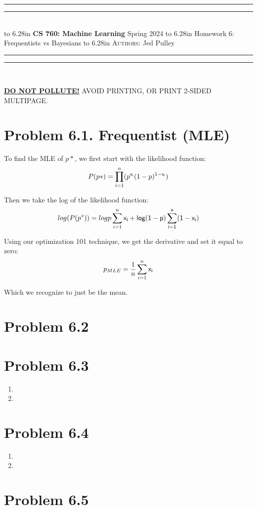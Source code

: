 \documentclass{article}
\newcommand{\lecture}[2]{
\pagestyle{myheadings}
\thispagestyle{plain}
\newpage
\noindent
\begin{center}
\rule{\textwidth}{1.6pt}\vspace*{-\baselineskip}\vspace*{2pt} %
\rule{\textwidth}{0.4pt}\\[1\baselineskip] %
\vbox{\vspace{2mm}
\hbox to 6.28in { {\bf CS 760: Machine Learning} \hfill Spring 2024 }
\vspace{4mm}
\hbox to 6.28in { {\Large \hfill #1  \hfill} }
\vspace{4mm}
\hbox to 6.28in { {\scshape Authors:}  #2 \hfill }}
\vspace{-2mm}
\rule{\textwidth}{0.4pt}\vspace*{-\baselineskip}\vspace{3.2pt} %
\rule{\textwidth}{1.6pt}\\[\baselineskip] %
\end{center}
\vspace*{4mm}
}
\begin{document}
\lecture{Homework 6: Frequentists vs Bayesians}{Jed Pulley}

\begin{center}
{\Large {\sf \underline{\textbf{DO NOT POLLUTE!}} AVOID PRINTING, OR PRINT 2-SIDED MULTIPAGE.}}
\end{center}

\section*{Problem 6.1. Frequentist (MLE)}
To find the MLE of $p*$, we first start with the likelihood function:
\[P(p*) = \prod^n_{i=1} (p^{\sf{x}_i}(1-p)^{1 - \sf{x}_i})\]

Then we take the log of the likelihood function:
\[ log(P(p^*)) = logp \sum_{i=1}^{n} \sf{x}_i + log (1 - p) \sum_{i=1}^{n}(1 - \sf{x}_i) \]

Using our optimization 101 technique, we get the derivative and set it equal to zero:
\[ p_{MLE} = \frac{1}{n} \sum_{i=1}^{n} \sf{x}_i \]

Which we recognize to just be the mean.


\section*{Problem 6.2}

\section*{Problem 6.3}
  \begin{enumerate}[label=(\alph*)]
    \item 
    \item 
\end{enumerate}

\section*{Problem 6.4}
  \begin{enumerate}[label=(\alph*)]
    \item 
    \item 
\end{enumerate}

\section*{Problem 6.5}
\end{document}
